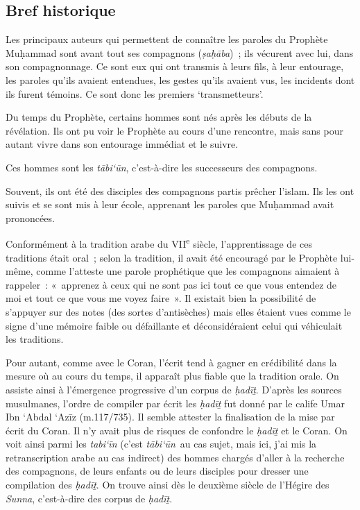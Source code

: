 \subsection{Bref historique
}\label{bref-historique}

\begin{Def}[ṣaḥāba]
Les principaux auteurs qui permettent de connaître les paroles du
Prophète Muḥammad sont avant tout ses compagnons (\emph{ṣaḥāba})~; ils
vécurent avec lui, dans son compagnonnage. Ce sont eux qui ont transmis
à leurs fils, à leur entourage, les paroles qu'ils avaient entendues,
les gestes qu'ils avaient vus, les incidents dont ils furent témoins. Ce
sont donc les premiers `transmetteurs'.
\end{Def}


Du temps du Prophète, certains hommes sont nés après les débuts de la
révélation. Ils ont pu voir le Prophète au cours d'une rencontre, mais
sans pour autant vivre dans son entourage immédiat et le suivre. 
\begin{Def}[tābi`ūn]
Ces
hommes sont les \emph{tābi`ūn}, c'est-à-dire les successeurs des
compagnons.
\end{Def}
 Souvent, ils ont été des disciples des compagnons partis
prêcher l'islam. Ils les ont suivis et se sont mis à leur école,
apprenant les paroles que Muḥammad avait prononcées.

Conformément à la tradition arabe du VII\textsuperscript{e} siècle,
l'apprentissage de ces traditions était oral~; selon la tradition, il
avait été encouragé par le Prophète lui-même, comme l'atteste une parole
prophétique que les compagnons aimaient à rappeler~: «~apprenez à ceux
qui ne sont pas ici tout ce que vous entendez de moi et tout ce que vous
me voyez faire~». Il existait bien la possibilité de s'appuyer sur des
notes (des sortes d'antisèches) mais elles étaient vues comme le signe
d'une mémoire faible ou défaillante et déconsidéraient celui qui
véhiculait les traditions.

Pour autant, comme avec le Coran, l'écrit tend à gagner en crédibilité
dans la mesure où au cours du temps, il apparaît plus fiable que la
tradition orale. On assiste ainsi à l'émergence progressive d'un corpus
de \emph{ḥadīṯ}. D'après les sources musulmanes, l'ordre de compiler par
écrit les \emph{ḥadīṯ} fut donné par le calife Umar Ibn `Abdal `Azīz
(m.117/735). Il semble attester la finalisation de
la mise par écrit du Coran. Il n'y avait plus de risques de confondre le
\emph{ḥadīṯ} et le Coran. On voit ainsi parmi les \emph{tabi`īn} (c'est
\emph{tābi`ūn}~au cas sujet, mais ici, j'ai mis la retranscription arabe
au cas indirect) des hommes chargés d'aller à la recherche des
compagnons, de leurs enfants ou de leurs disciples pour dresser une
compilation des \emph{ḥadīṯ}. On trouve ainsi dès le deuxième siècle de
l'Hégire des \emph{Sunna}, c'est-à-dire des corpus de \emph{ḥadīṯ}.

